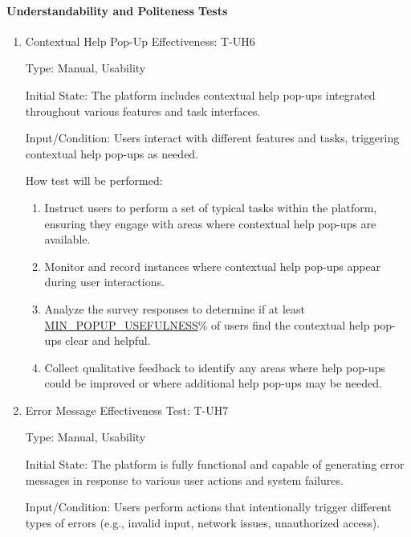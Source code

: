\documentclass[12pt, titlepage]{article}
\begin{document}
\paragraph{Understandability and Politeness Tests}
\begin{enumerate}

\item{Contextual Help Pop-Up Effectiveness: T-UH6\\}

Type: Manual, Usability

Initial State: The platform includes contextual help pop-ups integrated throughout various features and task interfaces.

Input/Condition: Users interact with different features and tasks, triggering contextual help pop-ups as needed.

How test will be performed:
\begin{enumerate}
    \item Instruct users to perform a set of typical tasks within the platform, ensuring they engage with areas where contextual help pop-ups are available.
    \item Monitor and record instances where contextual help pop-ups appear during user interactions.
    \item Analyze the survey responses to determine if at least \hyperref[MIN_POPUP_USEFULNESS]{MIN\_POPUP\_USEFULNESS}\% of users find the contextual help pop-ups clear and helpful.
    \item Collect qualitative feedback to identify any areas where help pop-ups could be improved or where additional help pop-ups may be needed.
\end{enumerate}

\item{Error Message Effectiveness Test: T-UH7\\}

Type: Manual, Usability

Initial State: The platform is fully functional and capable of generating error messages in response to various user actions and system failures.

Input/Condition: Users perform actions that intentionally trigger different types of errors (e.g., invalid input, network issues, unauthorized access).


\end{enumerate}
\end{document}
